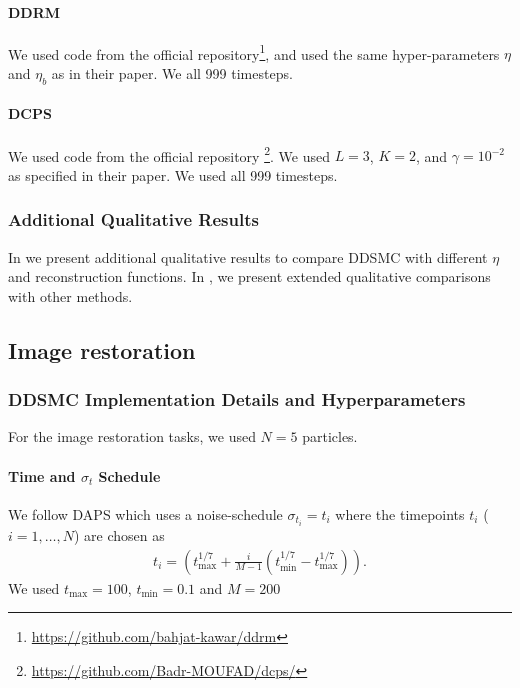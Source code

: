 \paragraph{DDRM}
We used code from the official repository\footnote{\url{https://github.com/bahjat-kawar/ddrm}}, and used the same hyper-parameters $\eta$ and $\eta_b$ as in their paper. We all 999 timesteps.

\paragraph{DCPS}
We used code from the official repository \footnote{\url{https://github.com/Badr-MOUFAD/dcps/}}. We used $L=3$, $K=2$, and $\gamma=10^{-2}$ as specified in their paper. We used all 999 timesteps.

\subsubsection{Additional Qualitative Results}
In  we present additional qualitative results to compare DDSMC with different $\eta$ and reconstruction functions. In , we present extended qualitative comparisons with other methods.







\subsection{Image restoration}
\label{app:image}
\subsubsection{DDSMC Implementation Details and Hyperparameters}
For the image restoration tasks, we used $N=5$ particles.
\paragraph{Time and $\sigma_t$ Schedule}
We follow DAPS which uses a noise-schedule $\sigma_{t_i} = t_i$ where the timepoints $t_i$ ($i=1, \dots, N$) are chosen as 
\begin{align}
    t_i = \left( t_\text{max}^{1/7} + \frac{i}{M-1}\left(t_\text{min}^{1/7} - t_\text{max}^{1/7}\right)\right).\label{eq:sigma_schedule}
\end{align} 
We used $t_\text{max} = 100$, $t_\text{min}=0.1$ and $M=200$

